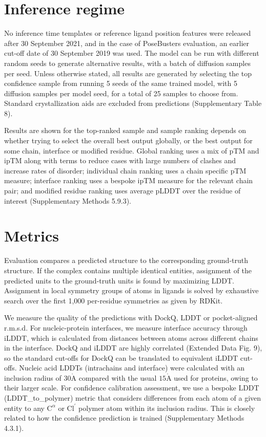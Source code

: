 \documentclass[10pt]{article}
\def\AA{\mathring{\mathrm{A}}}
\begin{document}
\section*{Inference regime}
No inference time templates or reference ligand position features were released after 30 September 2021, and in the case of PoseBusters evaluation, an earlier cut-off date of 30 September 2019 was used. The model can be run with different random seeds to generate alternative results, with a batch of diffusion samples per seed. Unless otherwise stated, all results are generated by selecting the top confidence sample from running 5 seeds of the same trained model, with 5 diffusion samples per model seed, for a total of 25 samples to choose from. Standard crystallization aids are excluded from predictions (Supplementary Table 8).

Results are shown for the top-ranked sample and sample ranking depends on whether trying to select the overall best output globally, or the best output for some chain, interface or modified residue. Global ranking uses a mix of pTM and ipTM along with terms to reduce cases with large numbers of clashes and increase rates of disorder; individual chain ranking uses a chain specific pTM measure; interface ranking uses a bespoke ipTM measure for the relevant chain pair; and modified residue ranking uses average pLDDT over the residue of interest (Supplementary Methods 5.9.3).

\section*{Metrics}
Evaluation compares a predicted structure to the corresponding ground-truth structure. If the complex contains multiple identical entities, assignment of the predicted units to the ground-truth units is found by maximizing LDDT. Assignment in local symmetry groups of atoms in ligands is solved by exhaustive search over the first 1,000 per-residue symmetries as given by RDKit.

We measure the quality of the predictions with DockQ, LDDT or pocket-aligned r.m.s.d. For nucleic-protein interfaces, we measure interface accuracy through iLDDT, which is calculated from distances between atoms across different chains in the interface. DockQ and iLDDT are highly correlated (Extended Data Fig. 9), so the standard cut-offs for DockQ can be translated to equivalent iLDDT cut-offs. Nucleic acid LDDTs (intrachains and interface) were calculated with an inclusion radius of $30 \AA$ compared with the usual $15 \AA$ used for proteins, owing to their larger scale. For confidence calibration assessment, we use a bespoke LDDT (LDDT\_to\_polymer) metric that considers differences from each atom of a given entity to any $\mathrm{C}^{\alpha}$ or $\mathrm{Cl}^{\prime}$ polymer atom within its inclusion radius. This is closely related to how the confidence prediction is trained (Supplementary Methods 4.3.1).
\end{document}
